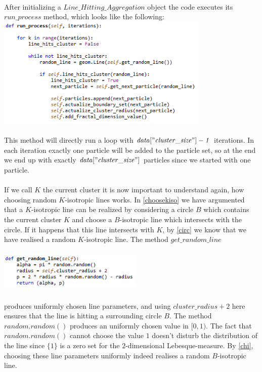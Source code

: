 \documentclass[12pt,a4paper]{scrartcl}
\numberwithin{equation}{subsection}
\newcommand{\1}{\mathbbm{1}}
\numberwithin{equation}{section}
\theoremstyle{definition}
\begin{document}
\\After initializing a $\mathit{Line\_Hitting\_Aggregation}$ object the code executes its $\mathit{run\_process}$ method, which looks like the following:
\\
\includegraphics[height=5.3cm]{images/code-snippets/runprocess.png} \\
\\
This method will directly run a loop with $\mathit{data["cluster\_size"] - 1}$ iterations. In each iteration exactly one particle will be added to the particle set, so at the end we end up with exactly $\mathit{data["cluster\_size"]}$ particles since we started with one particle. \\
\\If we call $K$ the current cluster it is now important to understand again, how choosing random $K$-isotropic lines works. In \ref{choosekiso} we have argumented that a $K$-isotropic line can be realized by considering a circle $B$ which contains the current cluster $K$ and choose a $B$-isotropic line which intersects with the circle. If it happens that this line intersects with $K$, by \ref{circ} we know that we have realised a random $K$-isotropic line. The method $\mathit{get\_random\_line}$ \\
\\
\includegraphics[height=1.8cm]{images/code-snippets/randomline.png} \\
\\
produces uniformly chosen line parameters, and using $\mathit{cluster\_radius + 2}$ here ensures that the line is hitting a surrounding circle $B$. The method $\mathit{random.random()}$ produces an uniformly chosen value in $[0,1)$. The fact that $\mathit{random.random()}$ cannot choose the value $1$ doesn't disturb the distribution of the line since $\{1\}$ is a zero set for the $2$-dimensional Lebesque-measure. By \ref{chi}, choosing these line parameters uniformly indeed realises a random $B$-isotropic line. \\
\end{document}
